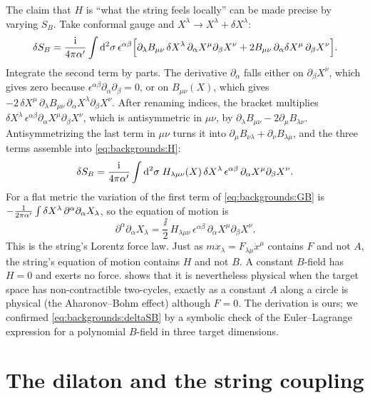 The claim that $H$ is ``what the string feels locally'' can be made precise by varying $S_B$.
Take conformal gauge and $X^\lambda\to X^\lambda+\delta X^\lambda$:
\[
  \delta S_B=\frac{\mathrm{i}}{4\pi\alpha'}\int\mathrm{d}^2\sigma\,\epsilon^{\alpha\beta}\Bigl[
  \partial_\lambda B_{\mu\nu}\,\delta X^\lambda\,\partial_\alpha X^\mu\partial_\beta X^\nu
  +2B_{\mu\nu}\,\partial_\alpha\delta X^\mu\,\partial_\beta X^\nu\Bigr].
\]
Integrate the second term by parts. The derivative $\partial_\alpha$ falls either on
$\partial_\beta X^\nu$, which gives zero because
$\epsilon^{\alpha\beta}\partial_\alpha\partial_\beta=0$, or on $B_{\mu\nu}(X)$, which gives
$-2\,\delta X^\mu\,\partial_\lambda B_{\mu\nu}\,\partial_\alpha X^\lambda\partial_\beta X^\nu$.
After renaming indices, the bracket multiplies
$\delta X^\lambda\,\epsilon^{\alpha\beta}\partial_\alpha X^\mu\partial_\beta X^\nu$, which is
antisymmetric in $\mu\nu$, by $\partial_\lambda B_{\mu\nu}-2\partial_\mu B_{\lambda\nu}$.
Antisymmetrizing the last term in $\mu\nu$ turns it into
$\partial_\mu B_{\nu\lambda}+\partial_\nu B_{\lambda\mu}$, and the three terms assemble into
\eqref{eq:backgrounds:H}:
\begin{equation}\label{eq:backgrounds:deltaSB}
  \delta S_B=\frac{\mathrm{i}}{4\pi\alpha'}\int\mathrm{d}^2\sigma\;H_{\lambda\mu\nu}(X)\,\delta X^\lambda\,
  \epsilon^{\alpha\beta}\,\partial_\alpha X^\mu\partial_\beta X^\nu .
\end{equation}
For a flat metric the variation of the first term of \eqref{eq:backgrounds:GB} is
$-\frac{1}{2\pi\alpha'}\int\delta X^\lambda\,\partial^\alpha\partial_\alpha X_\lambda$, so the
equation of motion is
\begin{equation}\label{eq:backgrounds:lorentz}
  \partial^\alpha\partial_\alpha X_\lambda
  =\frac{\ii}{2}\,H_{\lambda\mu\nu}\,\epsilon^{\alpha\beta}\,
  \partial_\alpha X^\mu\partial_\beta X^\nu .
\end{equation}
This is the string's Lorentz force law. Just as $m\ddot x_\lambda=F_{\lambda\mu}\dot x^\mu$
contains $F$ and not $A$, the string's equation of motion contains $H$ and not $B$. A
constant $B$-field has $H=0$ and exerts no force.  shows that it
is nevertheless physical when the target space has non-contractible two-cycles, exactly as a
constant $A$ along a circle is physical (the Aharonov--Bohm effect) although $F=0$. The
derivation is ours; we confirmed \eqref{eq:backgrounds:deltaSB} by a symbolic check of the
Euler--Lagrange expression for a polynomial $B$-field in three target dimensions.

\section{The dilaton and the string coupling}\label{sec:backgrounds:dilaton}

